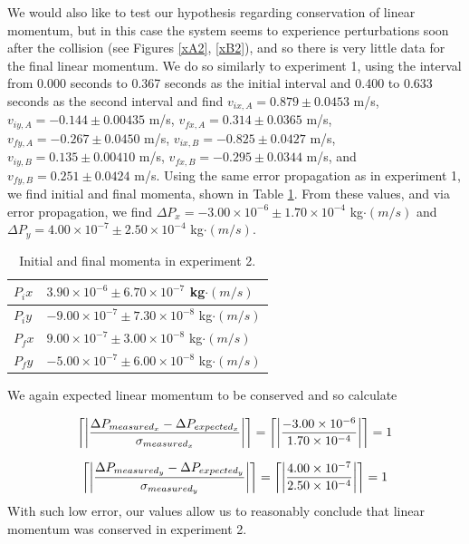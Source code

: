 \documentclass[11pt]{article}
\DeclarePairedDelimiter{\ceil}{\lceil}{\rceil}
\begin{document}
We would also like to test our hypothesis regarding conservation of linear momentum, but in this case the system seems to experience perturbations soon after the collision (see Figures \ref{xA2}, \ref{xB2}), and so there is very little data for the final linear momentum. We do so similarly to experiment 1, using the interval from 0.000 seconds to 0.367 seconds as the initial interval and 0.400 to 0.633 seconds as the second interval and find $v_{ix,A} = 0.879\pm0.0453$ m/s, $v_{iy,A} = -0.144\pm0.00435$ m/s, $v_{fx,A} = 0.314\pm0.0365$ m/s, $v_{fy,A} = -0.267\pm0.0450$ m/s, $v_{ix,B} = -0.825\pm0.0427$ m/s, $v_{iy,B} = 0.135\pm0.00410$ m/s, $v_{fx,B} = -0.295\pm0.0344$ m/s, and $v_{fy,B} = 0.251\pm0.0424$ m/s. Using the same error propagation as in experiment 1, we find initial and final momenta, shown in Table \ref{mom2}. From these values, and via error propagation, we find $\Delta P_x = -3.00\times10^{-6}\pm1.70\times 10^{-4}$ kg$\cdot(m/s)$ and $\Delta P_y = 4.00\times10^{-7}\pm2.50\times10^{-4}$ kg$\cdot(m/s)$.

\begin{table}[]
\centering
\caption{Initial and final momenta in experiment 2.}
\label{mom2}
\begin{tabular}{|l|l|}
\hline
$P_ix$ & $3.90\times10^{-6}\pm6.70\times10^{-7}$ kg$\cdot(m/s)$   \\ \hline
$P_iy$ & $-9.00\times10^{-7}\pm 7.30\times10^{-8}$ kg$\cdot(m/s)$ \\ \hline
$P_fx$ & $9.00\times10^{-7}\pm 3.00\times 10^{-8}$  kg$\cdot(m/s)$ \\ \hline
$P_fy$ & $-5.00\times10^{-7} \pm 6.00\times 10^{-8}$ kg$\cdot(m/s)$\\ \hline
\end{tabular}
\end{table}

We again expected linear momentum to be conserved and so calculate

\begin{align}
\ceil*{\left\vert\frac{\Delta P_{measured_x}-\Delta P_{expected_x}}{\sigma_{measured_x}}\right\vert} = \ceil*{\left\vert\frac{-3.00\times10^{-6}}{1.70\times 10^{-4}}\right\vert} = 1
\label{errPx2}
\end{align}

\begin{align}
\ceil*{\left\vert\frac{\Delta P_{measured_y}-\Delta P_{expected_y}}{\sigma_{measured_y}}\right\vert} = \ceil*{\left\vert\frac{4.00\times10^{-7}}{2.50\times10^{-4}}\right\vert} = 1
\label{errPy2}
\end{align}
With such low error, our values allow us to reasonably conclude that linear momentum was conserved in experiment 2.
\end{document}

